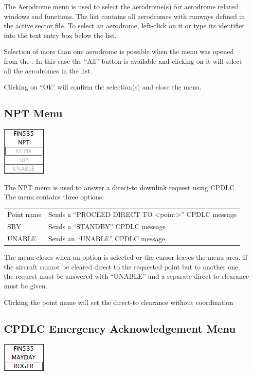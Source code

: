 \documentclass[11pt,a4paper,oldfontcommands]{memoir}
\newenvironment{Warn}
  {\begin{shaded}\marginnote{\fbox{Warning}}}
  {\end{shaded}}
\begin{document}
The Aerodrome menu is used to select the aerodrome(s) for aerodrome related windows and functions. The list contains all aerodromes with runways defined in the active sector file. To select an aerodrome, left-click on it or type its identifier into the text entry box below the list.

Selection of more than one aerodrome is possible when the menu was opened from the \textit{}. In this case the “All” button is available and clicking on it will select all the aerodromes in the list.

Clicking on “Ok” will confirm the selection(s) and close the menu.

\subsection{NPT Menu}
\label{menu:npt}
\includegraphics{img/npt.png}

The NPT menu is used to answer a direct-to downlink request using CPDLC. The menu
contains three options:

\begin{tabular}{l l}
Point name  & Sends a “PROCEED DIRECT TO <point>” CPDLC message\\
SBY         & Sends a “STANDBY” CPDLC message\\
UNABLE      & Sends an “UNABLE” CPDLC message\\   
\end{tabular}

The menu closes when an option is selected or the cursor leaves the menu area. If the aircraft cannot be cleared direct to the requested point but to another one, the request must be answered with “UNABLE” and a separate direct-to clearance must be given.

\begin{Warn}
Clicking the point name will set the direct-to clearance without coordination
\end{Warn}

\subsection{CPDLC Emergency Acknowledgement Menu}
\label{dleam}
\includegraphics{img/dlmayday.png}
\end{document}
